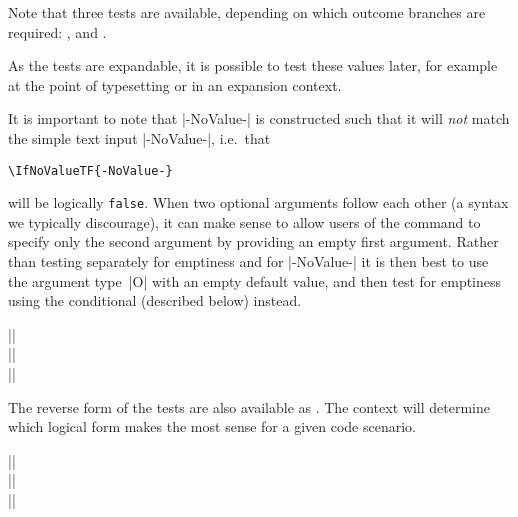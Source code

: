 \documentclass{ltxguide}
\begin{document}
Note that three tests are available, depending on which outcome
branches are required: ,  and
.

As the  tests are expandable, it is possible to
test these values later, for example at the point of typesetting or
in an expansion context.

It is important to note that |-NoValue-| is constructed such that it
will \emph{not} match the simple text input |-NoValue-|, i.e.~that
\begin{verbatim}
\IfNoValueTF{-NoValue-}
\end{verbatim}
will be logically \texttt{false}.
When two optional arguments follow each other (a syntax we typically
discourage), it can make sense to allow users of the command to
specify only the second argument by providing an empty first
argument.
Rather than testing separately for emptiness and for
|-NoValue-| it is then best to use the argument type~|O| with an
empty default value, and then test for emptiness using the
conditional  (described below) instead.

\begin{decl}
  |\IfValueTF|    \\
  |\IfValueT|    \\
  |\IfValueF|   
\end{decl}
The reverse form of the  tests are also available
as . The context will determine which logical
form makes the most sense for a given code scenario.





\begin{decl}[2022/06/01]
  |\IfBlankTF|    \\
  |\IfBlankT|    \\
  |\IfBlankF|   
\end{decl}
\end{document}
